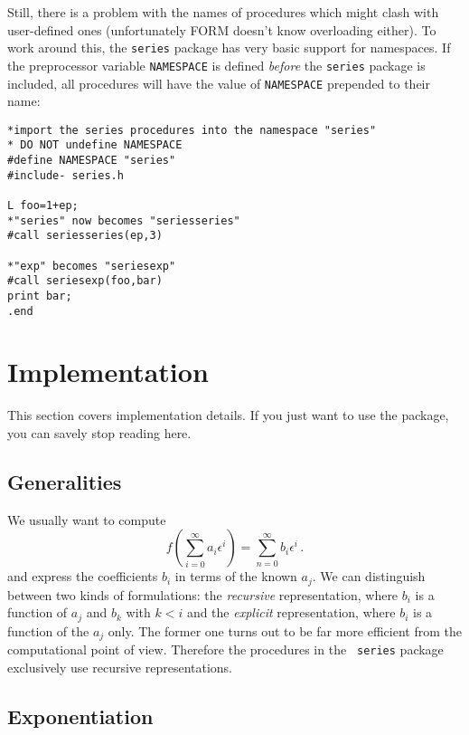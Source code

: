 \documentclass{article}
\begin{document}
Still, there is a problem with the names of procedures which might clash
with user-defined ones (unfortunately FORM doesn't know overloading
either). To work around this, the {\tt series} package has very basic
support for namespaces. If the preprocessor variable {\tt NAMESPACE} is
defined {\em before} the {\tt series} package is included, all
procedures will have the value of {\tt NAMESPACE} prepended to their name:
\begin{verbatim}
*import the series procedures into the namespace "series"
* DO NOT undefine NAMESPACE
#define NAMESPACE "series"
#include- series.h

L foo=1+ep;
*"series" now becomes "seriesseries"
#call seriesseries(ep,3)

*"exp" becomes "seriesexp"
#call seriesexp(foo,bar)
print bar;
.end
\end{verbatim}

\appendix

\section{Implementation}
\label{sec:impl}

This section covers implementation details. If you just want to use the
package, you can savely stop reading here.

\subsection{Generalities}
\label{sec:impl_general}


 We usually want to compute
\begin{equation}
  \label{eq:def}
  f\left(\sum_{i=0}^{\infty}a_i \epsilon^i\right)=\sum_{n=0}^\infty b_i \epsilon^i\,.
\end{equation}
and express the coefficients $b_i$ in terms of the known $a_j$. We can
distinguish between two kinds of formulations: the {\it recursive} representation,
where $b_i$ is a function of $a_j$ and $b_k$ with $k < i$ and the {\it
  explicit} representation, where $b_i$ is a function of the $a_j$ only.
The former one turns out to be far more efficient from the
computational point of view. Therefore the procedures in the {\tt
  series} package exclusively use recursive representations.

\subsection{Exponentiation}
\label{sec:impl_exp}
\end{document}
